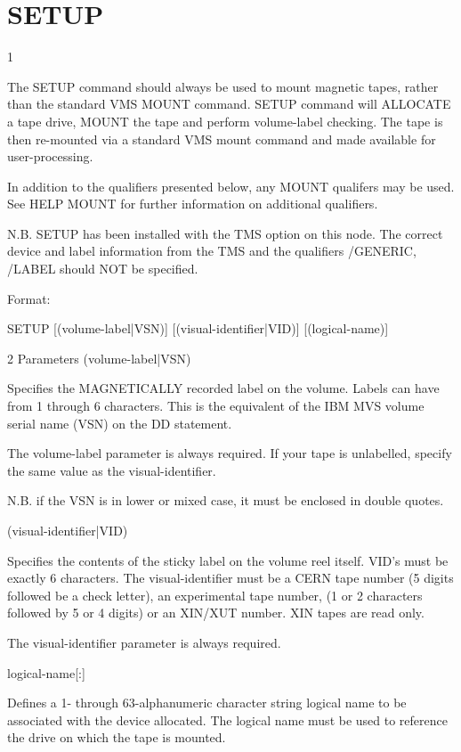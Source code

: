 \section{SETUP}
\begin{XMP}
1 

 The SETUP command should always be used to mount magnetic tapes,
 rather than the standard VMS MOUNT command.
 SETUP command will ALLOCATE a tape drive, MOUNT the tape
 and perform volume-label checking. The tape is then re-mounted via a
 standard VMS mount command and made available for user-processing.

 In addition to the qualifiers presented below, any MOUNT qualifers
 may be used. See HELP MOUNT for further information on additional
 qualifiers.

 N.B. SETUP has been installed with the TMS option on this node.
 The correct device and label information from the TMS and the
 qualifiers /GENERIC, /LABEL should NOT be specified.

 Format:

      SETUP [(volume-label|VSN)] [(visual-identifier|VID)] [(logical-name)]

2 Parameters
 (volume-label|VSN)

  Specifies the MAGNETICALLY recorded label on the volume.
  Labels can have from 1 through 6 characters. This is the
  equivalent of the IBM MVS volume serial name (VSN) on the DD statement.

  The volume-label parameter is  always required. If your tape is unlabelled,
  specify the same value as the visual-identifier.

  N.B. if the VSN is in lower or mixed case, it must be enclosed in
  double quotes.

 (visual-identifier|VID)

  Specifies the contents of the sticky label on the volume reel itself.
  VID's must be exactly 6 characters.
  The visual-identifier must be a CERN tape number (5 digits followed
  be a check letter), an experimental tape number, (1 or 2 characters
  followed by 5 or 4 digits) or an XIN/XUT number.
  XIN tapes are read only.

  The visual-identifier parameter is  always required.

 logical-name[:]

  Defines a 1- through  63-alphanumeric  character  string  logical
  name to be associated with the device allocated.
  The logical name must be used to reference the drive on which the
  tape is mounted.


\end{XMP}
